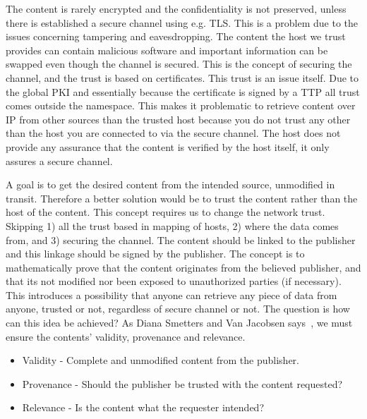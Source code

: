 The content is rarely encrypted and the confidentiality is not preserved, unless there is established a secure channel using e.g. \gls{TLS}.
This is a problem due to the issues concerning tampering and eavesdropping.
The content the host we trust provides can contain malicious software and important information can be swapped even though the channel is secured.
This is the concept of securing the channel, and the trust is based on certificates.
This trust is an issue itself. 
Due to the global \gls{PKI} and essentially because the certificate is signed by a \gls{TTP} all trust comes outside the namespace.
This makes it problematic to retrieve content over \gls{IP} from other sources than the trusted host because you do not trust any other than the host you are connected to via the secure channel.
The host does not provide any assurance that the content is verified by the host itself, it only assures a secure channel.

A goal is to get the desired content from the intended source, unmodified in transit.
Therefore a better solution would be to trust the content rather than the \gls{host} of the content.
This concept requires us to change the network trust.
Skipping 1) all the trust based in mapping of hosts, 2) where the data comes from, and 3) securing the channel.
The content should be linked to the \gls{publisher} and this linkage should be signed by the \gls{publisher}. 
The concept is to mathematically prove that the content originates from the believed \gls{publisher}, and that its not modified nor been exposed to unauthorized parties (if necessary).
This introduces a possibility that anyone can retrieve any piece of data from anyone, trusted or not, regardless of secure channel or not.
The question is how can this idea be achieved? 
As Diana Smetters and Van Jacobsen says~\cite{secure-network-content}, we must ensure the contents' validity, provenance and relevance.

\begin{itemize}
  \item Validity - Complete and unmodified content from the \gls{publisher}.
  \item Provenance - Should the \gls{publisher} be trusted with the content requested?
  \item Relevance - Is the content what the requester intended?
\end{itemize}

